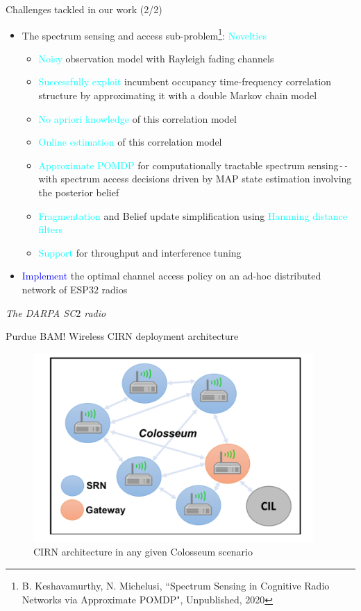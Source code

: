 \documentclass{beamer}
\begin{document}
\begin{frame}{Challenges tackled in our work (2/2)}
\begin{itemize}
    \item The spectrum sensing and access sub-problem\footnote{\tiny{B. Keshavamurthy, N. Michelusi, ``Spectrum Sensing in Cognitive Radio Networks via Approximate POMDP", Unpublished, 2020}}: \textcolor{cyan}{Novelties}
    \begin{itemize}
        \item \textcolor{cyan}{Noisy} observation model with Rayleigh fading channels
        \item \textcolor{cyan}{Successfully exploit} incumbent occupancy time-frequency correlation structure by approximating it with a double Markov chain model
        \item \textcolor{cyan}{No apriori knowledge} of this correlation model
        \item \textcolor{cyan}{Online estimation} of this correlation model
        \item \textcolor{cyan}{Approximate POMDP} for computationally tractable spectrum sensing\texttt{-{}-}with spectrum access decisions driven by MAP state estimation involving the posterior belief
        \item \textcolor{cyan}{Fragmentation} and Belief update simplification using \textcolor{cyan}{Hamming distance filters}
        \item \textcolor{cyan}{Support} for throughput and interference tuning
    \end{itemize}
    \item \textcolor{blue}{Implement} the optimal channel access policy on an ad-hoc distributed network of ESP$32$ radios
\end{itemize}
\end{frame}
\begin{frame}{}
  \centering \Huge
  \emph{The DARPA SC$2$ radio}
\end{frame}
\begin{frame}{Purdue BAM! Wireless CIRN deployment architecture}
\begin{figure}
    \centering
    \includegraphics[width = 0.95\textwidth]{BAM!_Wireless_Architecture.PNG}
    \caption{CIRN architecture in any given Colosseum scenario}
    \label{fig:1}
\end{figure}
\end{frame}
\end{document}
